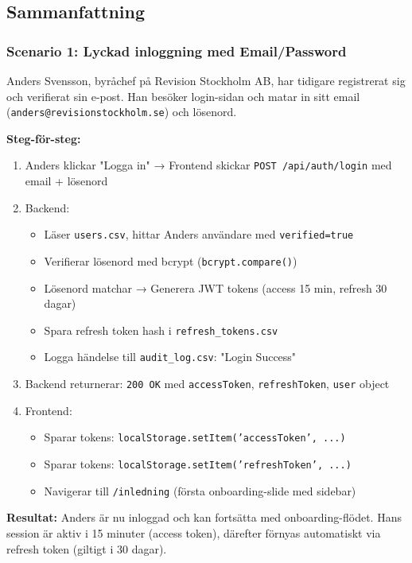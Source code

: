 \documentclass[12pt,a4paper]{article}
\begin{document}
\subsection{Sammanfattning}

\subsubsection{Scenario 1: Lyckad inloggning med Email/Password}

Anders Svensson, byråchef på Revision Stockholm AB, har tidigare registrerat sig och verifierat sin e-post. Han besöker login-sidan och matar in sitt email (\texttt{anders@revisionstockholm.se}) och lösenord.

\textbf{Steg-för-steg:}
\begin{enumerate}[noitemsep]
  \item Anders klickar "Logga in" → Frontend skickar \texttt{POST /api/auth/login} med email + lösenord
  \item Backend:
  \begin{itemize}[noitemsep]
    \item Läser \texttt{users.csv}, hittar Anders användare med \texttt{verified=true}
    \item Verifierar lösenord med bcrypt (\texttt{bcrypt.compare()})
    \item Lösenord matchar → Generera JWT tokens (access 15 min, refresh 30 dagar)
    \item Spara refresh token hash i \texttt{refresh\_tokens.csv}
    \item Logga händelse till \texttt{audit\_log.csv}: "Login Success"
  \end{itemize}
  \item Backend returnerar: \texttt{200 OK} med \texttt{accessToken}, \texttt{refreshToken}, \texttt{user} object
  \item Frontend:
  \begin{itemize}[noitemsep]
    \item Sparar tokens: \texttt{localStorage.setItem('accessToken', ...)}
    \item Sparar tokens: \texttt{localStorage.setItem('refreshToken', ...)}
    \item Navigerar till \texttt{/inledning} (första onboarding-slide med sidebar)
  \end{itemize}
\end{enumerate}

\textbf{Resultat:} Anders är nu inloggad och kan fortsätta med onboarding-flödet. Hans session är aktiv i 15 minuter (access token), därefter förnyas automatiskt via refresh token (giltigt i 30 dagar).
\end{document}
